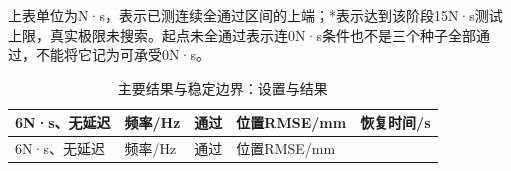 上表单位为N·s，表示已测连续全通过区间的上端；*表示达到该阶段15N·s测试上限，真实极限未搜索。起点未全通过表示连0N·s条件也不是三个种子全部通过，不能将它记为可承受0N·s。



\FloatBarrier\begingroup\small\setlength{\tabcolsep}{2.5pt}
\begin{longtable}[]{@{}
  >{\raggedright\arraybackslash}p{}
  >{\raggedright\arraybackslash}p{}
  >{\raggedright\arraybackslash}p{}
  >{\raggedright\arraybackslash}p{}
  >{\raggedright\arraybackslash}p{}@{}}
\caption{主要结果与稳定边界：设置与结果}\label{tab:s18-5}\tabularnewline
\toprule\noalign{}
\begin{minipage}[b]{\linewidth}\raggedright
6N·s、无延迟
\end{minipage} & \begin{minipage}[b]{\linewidth}\raggedright
频率/Hz
\end{minipage} & \begin{minipage}[b]{\linewidth}\raggedright
通过
\end{minipage} & \begin{minipage}[b]{\linewidth}\raggedright
位置RMSE/mm
\end{minipage} & \begin{minipage}[b]{\linewidth}\raggedright
恢复时间/s
\end{minipage} \\
\midrule\noalign{}
\endfirsthead
\toprule\noalign{}
\begin{minipage}[b]{\linewidth}\raggedright
6N·s、无延迟
\end{minipage} & \begin{minipage}[b]{\linewidth}\raggedright
频率/Hz
\end{minipage} & \begin{minipage}[b]{\linewidth}\raggedright
通过
\end{minipage} & \begin{minipage}[b]{\linewidth}\raggedright
位置RMSE/mm

\end{minipage}
\end{longtable}
